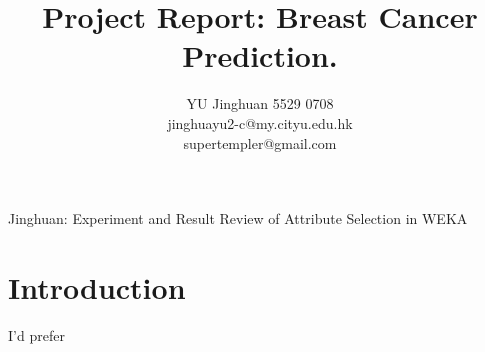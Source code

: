 \documentclass[journal,onecolumn]{IEEEtran}
\begin{document}
	\title{Project Report: Breast Cancer Prediction.}
	
	\author{YU Jinghuan 5529 0708 \\ jinghuayu2-c@my.cityu.edu.hk \\ supertempler@gmail.com}
	
	{Jinghuan: Experiment and Result Review of Attribute Selection in WEKA}

	\maketitle	
	
	\section{Introduction}
		I'd prefer 
	
	
	
	
\end{document}
